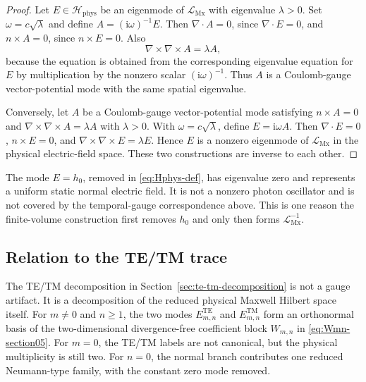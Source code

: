 \documentclass[11pt]{article}
\providecommand{\ii}{\mathrm{i}}
\providecommand{\Hphys}{\mathcal H_{\mathrm{phys}}}
\providecommand{\LMx}{\mathcal L_{\mathrm{Mx}}}
\numberwithin{equation}{section}
\begin{document}
\begin{proof}
Let \(E\in\Hphys\) be an eigenmode of \(\LMx\) with eigenvalue
\(\lambda>0\).  Set \(\omega=c\sqrt{\lambda}\) and define
\(A=(\ii\omega)^{-1}E\).  Then \(\nabla\cdot A=0\), since
\(\nabla\cdot E=0\), and \(n\times A=0\), since \(n\times E=0\).  Also
\begin{equation}
    \nabla\times\nabla\times A
    =\lambda A,
\end{equation}
because the equation is obtained from the corresponding eigenvalue equation
for \(E\) by multiplication by the nonzero scalar \((\ii\omega)^{-1}\).  Thus
\(A\) is a Coulomb-gauge vector-potential mode with the same spatial
eigenvalue.

Conversely, let \(A\) be a Coulomb-gauge vector-potential mode satisfying
\(n\times A=0\) and
\(\nabla\times\nabla\times A=\lambda A\) with \(\lambda>0\).  With
\(\omega=c\sqrt{\lambda}\), define \(E=\ii\omega A\).  Then
\(\nabla\cdot E=0\), \(n\times E=0\), and
\(\nabla\times\nabla\times E=\lambda E\).  Hence \(E\) is a nonzero eigenmode
of \(\LMx\) in the physical electric-field space.  These two constructions are
inverse to each other.
\end{proof}

\begin{remark}
\label{rem:static-mode-no-A-oscillator}
The mode \(E=h_0\), removed in \eqref{eq:Hphys-def}, has eigenvalue zero and
represents a uniform static normal electric field.  It is not a nonzero photon
oscillator and is not covered by the temporal-gauge correspondence above.  This
is one reason the finite-volume construction first removes \(h_0\) and only
then forms \(\LMx^{-1}\).
\end{remark}

\subsection{Relation to the TE/TM trace}
\label{subsec:gauge-comment-te-tm}

The TE/TM decomposition in Section~\ref{sec:te-tm-decomposition} is not a
gauge artifact.  It is a decomposition of the reduced physical Maxwell
Hilbert space itself.  For \(m\ne0\) and \(n\ge1\), the two modes
\(E^{\mathrm{TE}}_{m,n}\) and \(E^{\mathrm{TM}}_{m,n}\) form an orthonormal
basis of the two-dimensional divergence-free coefficient block
\(W_{m,n}\) in \eqref{eq:Wmn-section05}.  For \(m=0\), the TE/TM labels are
not canonical, but the physical multiplicity is still two.  For \(n=0\), the
normal branch contributes one reduced Neumann-type family, with the constant
zero mode removed.
\end{document}
